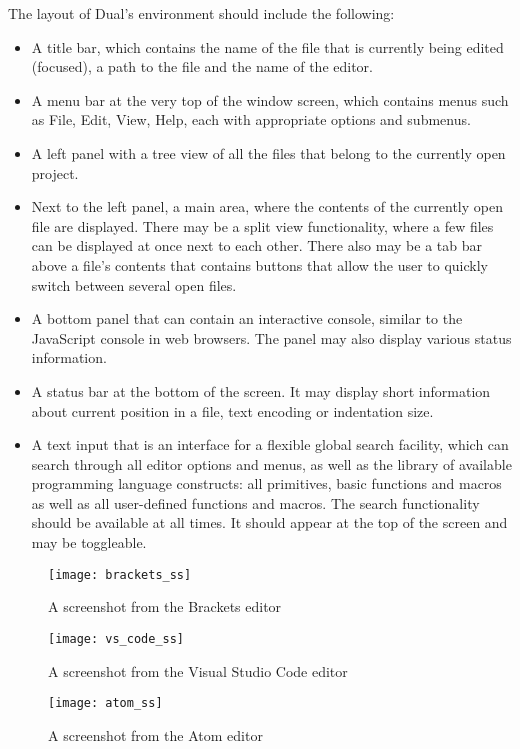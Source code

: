 The layout of Dual's environment should include the following:
\begin{itemize}
\item A title bar, which contains the name of the file that is currently being edited (focused), a path to the file and the name of the editor.
\item A menu bar at the very top of the window screen, which contains menus such as File, Edit, View, Help, each with appropriate options and submenus.
\item A left panel with a tree view of all the files that belong to the currently open project. 
\item Next to the left panel, a main area, where the contents of the currently open file are displayed. There may be a split view functionality, where a few files can be displayed at once next to each other. There also may be a tab bar above a file's contents that contains buttons that allow the user to quickly switch between several open files.
\item A bottom panel that can contain an interactive console, similar to the JavaScript console in web browsers. The panel may also display various status information.
\item A status bar at the bottom of the screen. It may display short information about current position in a file, text encoding or indentation size.
\item A text input that is an interface for a flexible global search facility, which can search through all editor options and menus, as well as the library of available programming language constructs: all primitives, basic functions and macros as well as all user-defined functions and macros. The search functionality should be available at all times. It should appear at the top of the screen and may be toggleable.
\end{itemize}

\begin{figure}[h!]
\centering \texttt{[image: brackets\_ss]}
\caption{
    A screenshot from the Brackets editor
}
\label{fig:brackets_ss}
\end{figure}

\begin{figure}[h!]
\centering \texttt{[image: vs\_code\_ss]}
\caption{
    A screenshot from the Visual Studio Code editor
}
\label{fig:vs_code_ss}
\end{figure}

\begin{figure}[h!]
\centering \texttt{[image: atom\_ss]}
\caption{
    A screenshot from the Atom editor
}
\label{fig:atom_ss}
\end{figure}


